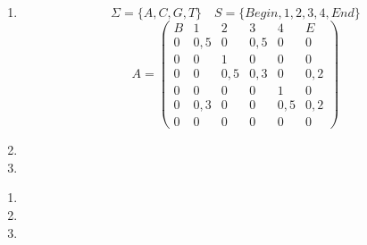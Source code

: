 \documentclass{homework}
\begin{document}
\begin{enumerate}
\begin{enumerate}
\item $$\Sigma = \{A, C, G, T\} \quad S = \{Begin, 1, 2, 3, 4, End\}$$
$$A = \begin{pmatrix}
B	& 1		& 2		& 3		& 4		& E\\
0	& 0,5	& 0		& 0,5	& 0		& 0\\
0	& 0		& 1		& 0		& 0		& 0\\
0	& 0		& 0,5	& 0,3	& 0		& 0,2\\
0	& 0		& 0		& 0		& 1		& 0\\
0	& 0,3	& 0		& 0		& 0,5	& 0,2\\
0	& 0		& 0		& 0		& 0		& 0
\end{pmatrix}$$

\item 

\item 

\end{enumerate}


\begin{enumerate}
\item
	
\item

\item

\end{enumerate}

\end{enumerate}
\end{document}
